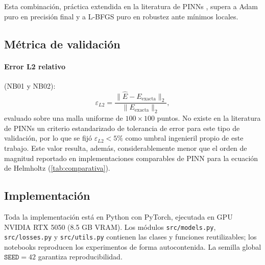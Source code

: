 Esta combinación, práctica extendida en la literatura de PINNs \citep{Cuomo2022_review},
supera a Adam puro en precisión final y a L-BFGS puro en robustez ante mínimos locales.

\subsection{Métrica de validación}
\label{subsec:metricas}

\paragraph{Error L2 relativo} (NB01 y NB02):
%
\begin{equation}
  \varepsilon_{L2} = \frac{\|\hat{E} - E_{\mathrm{exacta}}\|_2}{\|E_{\mathrm{exacta}}\|_2},
  \label{eq:l2}
\end{equation}
%
evaluado sobre una malla uniforme de $100 \times 100$ puntos.
No existe en la literatura de PINNs un criterio estandarizado de tolerancia de error
para este tipo de validación, por lo que se fijó $\varepsilon_{L2} < 5\%$ como umbral
ingenieril propio de este trabajo. Este valor resulta, además, considerablemente menor
que el orden de magnitud reportado en implementaciones comparables de PINN para la
ecuación de Helmholtz (\cref{tab:comparativa}).

\subsection{Implementación}
\label{subsec:implementacion}

Toda la implementación está en Python con PyTorch, ejecutada en GPU NVIDIA RTX 5050
(8.5 GB VRAM).
Los módulos \texttt{src/models.py}, \texttt{src/losses.py} y \texttt{src/utils.py}
contienen las clases y funciones reutilizables; los notebooks reproducen los experimentos
de forma autocontenida.
La semilla global $\texttt{SEED} = 42$ garantiza reproducibilidad.
